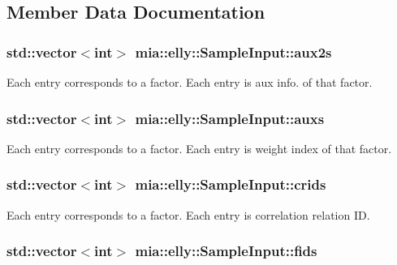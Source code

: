 \subsection{Member Data Documentation}
\hypertarget{classmia_1_1elly_1_1_sample_input_abae0c93ca188fa3f6a73bb198dbe8185}{
\subsubsection[{aux2s}]{\setlength{\rightskip}{0pt plus 5cm}std\-::vector$<$int$>$ mia\-::elly\-::\-Sample\-Input\-::aux2s}}\label{classmia_1_1elly_1_1_sample_input_abae0c93ca188fa3f6a73bb198dbe8185}
Each entry corresponds to a factor. Each entry is aux info. of that factor. \hypertarget{classmia_1_1elly_1_1_sample_input_a786191b105d76064643ab015171221fa}{
\subsubsection[{auxs}]{\setlength{\rightskip}{0pt plus 5cm}std\-::vector$<$int$>$ mia\-::elly\-::\-Sample\-Input\-::auxs}}\label{classmia_1_1elly_1_1_sample_input_a786191b105d76064643ab015171221fa}
Each entry corresponds to a factor. Each entry is weight index of that factor. \hypertarget{classmia_1_1elly_1_1_sample_input_ada60cb9fdfced8b9f4050e0c4f4b9892}{
\subsubsection[{crids}]{\setlength{\rightskip}{0pt plus 5cm}std\-::vector$<$int$>$ mia\-::elly\-::\-Sample\-Input\-::crids}}\label{classmia_1_1elly_1_1_sample_input_ada60cb9fdfced8b9f4050e0c4f4b9892}
Each entry corresponds to a factor. Each entry is correlation relation I\-D. \hypertarget{classmia_1_1elly_1_1_sample_input_a059df0f264855a7c3546979e07d142a0}{
\subsubsection[{fids}]{\setlength{\rightskip}{0pt plus 5cm}std\-::vector$<$int$>$ mia\-::elly\-::\-Sample\-Input\-::fids}}\label{classmia_1_1elly_1_1_sample_input_a059df0f264855a7c3546979e07d142a0}
